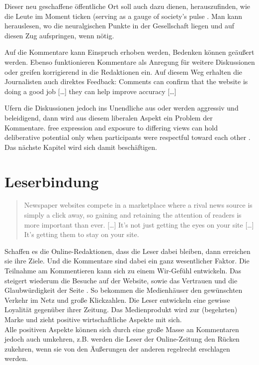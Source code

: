 Dieser neu geschaffene öffentliche Ort soll auch dazu dienen, herauszufinden,
wie die Leute im Moment \glqq ticken\grqq\- (\glqq serving as a gauge of society’s pulse\grqq\-
 \autocite[S.~181]{loke}. Man kann herauslesen, wo die neuralgischen Punkte in
der Gesellschaft liegen und auf diesen Zug aufspringen, wenn nötig.

Auf die Kommentare kann Einspruch erhoben werden, Bedenken können geäußert werden.
Ebenso funktionieren Kommentare als Anregung für weitere Diskussionen oder
greifen korrigierend  in die Redaktionen ein. Auf diesem Weg erhalten die
Journalisten auch direktes Feedback: \glqq Comments can confirm that the website is
doing a good job [\ldots] they can help improve accuracy [\ldots]\grqq\-
\autocite[S.~105]{reich}

Ufern die Diskussionen jedoch ins Unendliche aus oder werden aggressiv und
beleidigend, dann wird aus diesem liberalen Aspekt ein Problem der Kommentare.
\glqq[\ldots] free expression and exposure to differing views can hold deliberative
potential only when participants were respectful toward each other\grqq\-
\autocite[S.~7]{santana:2011}. Das nächste Kapitel wird sich damit beschäftigen.





\section{Leserbindung}
\begin{quote}
\glqq Newspaper websites compete in a marketplace where a rival news source is simply
a click away, so gaining and retaining the attention of readers is more
important than ever. [\ldots] It’s not just getting the eyes on your site
[\ldots] It’s getting them to stay on your site.\grqq\- \autocite[S.~144]{singer}
\end{quote}

Schaffen es die Online-Redaktionen, dass die Leser dabei bleiben, dann erreichen
sie ihre Ziele. Und die Kommentare sind dabei ein ganz wesentlicher Faktor. Die
Teilnahme am Kommentieren kann sich zu einem Wir-Gefühl entwickeln. Das steigert
wiederum die Besuche auf der Website, sowie das Vertrauen und die
Glaubwürdigkeit der Seite \autocite[S.~215]{meyer-carey}. So bekommen die
Medienhäuser den gewünschten Verkehr im Netz und große Klickzahlen. Die Leser
entwickeln eine gewisse Loyalität gegenüber ihrer Zeitung. Das Medienprodukt
wird zur (begehrten) Marke und zieht positive wirtschaftliche Aspekte mit sich.\\
Alle positiven Aspekte können sich durch eine große Masse an Kommentaren jedoch
auch umkehren, z.B. werden die Leser der Online-Zeitung den Rücken zukehren,
wenn sie von den Äußerungen der anderen regelrecht erschlagen werden.

